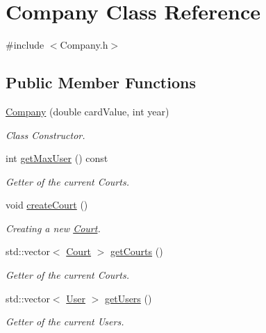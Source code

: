 \hypertarget{class_company}{}\section{Company Class Reference}
\label{class_company}


{\ttfamily \#include $<$Company.\+h$>$}

\subsection*{Public Member Functions}
\begin{DoxyCompactItemize}
\item 
\mbox{\hyperlink{class_company_ac97cf640176971922a434b766627774f}{Company}} (double card\+Value, int year)
\begin{DoxyCompactList}\small\item\em Class Constructor. \end{DoxyCompactList}\item 
int \mbox{\hyperlink{class_company_a837fd39a8f03c20a3ceb8617410956b7}{get\+Max\+User}} () const
\begin{DoxyCompactList}\small\item\em Getter of the current Courts. \end{DoxyCompactList}\item 
\mbox{\label{class_company_a10770d690a59f9b4d9f84de6d0f527c9}} 
void \mbox{\hyperlink{class_company_a10770d690a59f9b4d9f84de6d0f527c9}{create\+Court}} ()
\begin{DoxyCompactList}\small\item\em Creating a new \mbox{\hyperlink{class_court}{Court}}. \end{DoxyCompactList}\item 
std\+::vector$<$ \mbox{\hyperlink{class_court}{Court}} $>$ \mbox{\hyperlink{class_company_afa0ab125a0ba718fe2c13802fe1703be}{get\+Courts}} ()
\begin{DoxyCompactList}\small\item\em Getter of the current Courts. \end{DoxyCompactList}\item 
std\+::vector$<$ \mbox{\hyperlink{class_user}{User}} $>$ \mbox{\hyperlink{class_company_a6f6a3dbf24278f5e1395d123d5812f33}{get\+Users}} ()
\begin{DoxyCompactList}\small\item\em Getter of the current Users. \end{DoxyCompactList}\item 

\end{DoxyCompactItemize}
